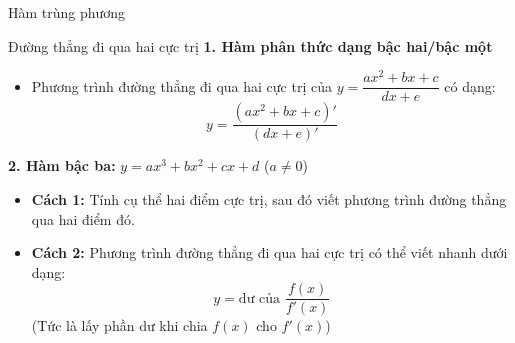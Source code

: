 \begin{lythuyetbox}{Hàm trùng phương}
\begin{center}
\end{center}

\end{lythuyetbox}

\begin{lythuyetbox}{Đường thẳng đi qua hai cực trị}
\textbf{1. Hàm phân thức dạng bậc hai/bậc một}

\begin{itemize}
    \item Phương trình đường thẳng đi qua hai cực trị của $y = \dfrac{ax^2+bx+c}{dx+e}$ có dạng:
    \[
        y = \frac{(ax^2+bx+c)'}{(dx+e)'}
    \]
\end{itemize}

\textbf{2. Hàm bậc ba:} $y = ax^3 + bx^2 + cx + d$ ($a \neq 0$)

\begin{itemize}
    \item \textbf{Cách 1:} Tính cụ thể hai điểm cực trị, sau đó viết phương trình đường thẳng qua hai điểm đó.
    \item \textbf{Cách 2:} Phương trình đường thẳng đi qua hai cực trị có thể viết nhanh dưới dạng:
    \[
        y = \text{dư của } \frac{f(x)}{f'(x)}
    \]
    (Tức là lấy phần dư khi chia $f(x)$ cho $f'(x)$)
\end{itemize}
\end{lythuyetbox}